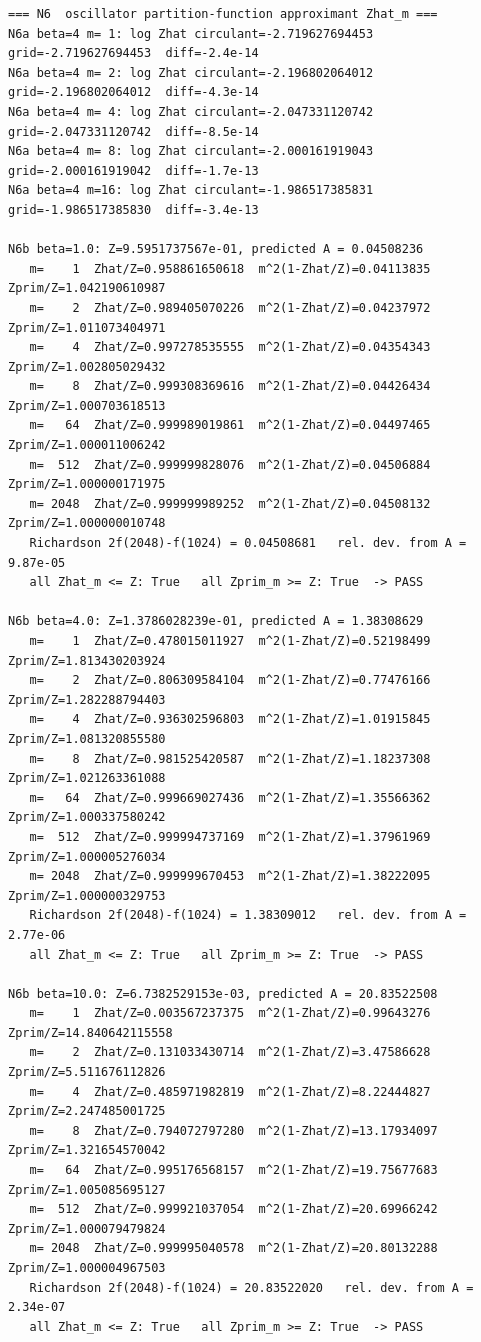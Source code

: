 \documentclass[11pt,a4paper]{article}
\begin{document}
\begin{lstlisting}
=== N6  oscillator partition-function approximant Zhat_m ===
N6a beta=4 m= 1: log Zhat circulant=-2.719627694453  grid=-2.719627694453  diff=-2.4e-14
N6a beta=4 m= 2: log Zhat circulant=-2.196802064012  grid=-2.196802064012  diff=-4.3e-14
N6a beta=4 m= 4: log Zhat circulant=-2.047331120742  grid=-2.047331120742  diff=-8.5e-14
N6a beta=4 m= 8: log Zhat circulant=-2.000161919043  grid=-2.000161919042  diff=-1.7e-13
N6a beta=4 m=16: log Zhat circulant=-1.986517385831  grid=-1.986517385830  diff=-3.4e-13

N6b beta=1.0: Z=9.5951737567e-01, predicted A = 0.04508236
   m=    1  Zhat/Z=0.958861650618  m^2(1-Zhat/Z)=0.04113835  Zprim/Z=1.042190610987
   m=    2  Zhat/Z=0.989405070226  m^2(1-Zhat/Z)=0.04237972  Zprim/Z=1.011073404971
   m=    4  Zhat/Z=0.997278535555  m^2(1-Zhat/Z)=0.04354343  Zprim/Z=1.002805029432
   m=    8  Zhat/Z=0.999308369616  m^2(1-Zhat/Z)=0.04426434  Zprim/Z=1.000703618513
   m=   64  Zhat/Z=0.999989019861  m^2(1-Zhat/Z)=0.04497465  Zprim/Z=1.000011006242
   m=  512  Zhat/Z=0.999999828076  m^2(1-Zhat/Z)=0.04506884  Zprim/Z=1.000000171975
   m= 2048  Zhat/Z=0.999999989252  m^2(1-Zhat/Z)=0.04508132  Zprim/Z=1.000000010748
   Richardson 2f(2048)-f(1024) = 0.04508681   rel. dev. from A = 9.87e-05
   all Zhat_m <= Z: True   all Zprim_m >= Z: True  -> PASS

N6b beta=4.0: Z=1.3786028239e-01, predicted A = 1.38308629
   m=    1  Zhat/Z=0.478015011927  m^2(1-Zhat/Z)=0.52198499  Zprim/Z=1.813430203924
   m=    2  Zhat/Z=0.806309584104  m^2(1-Zhat/Z)=0.77476166  Zprim/Z=1.282288794403
   m=    4  Zhat/Z=0.936302596803  m^2(1-Zhat/Z)=1.01915845  Zprim/Z=1.081320855580
   m=    8  Zhat/Z=0.981525420587  m^2(1-Zhat/Z)=1.18237308  Zprim/Z=1.021263361088
   m=   64  Zhat/Z=0.999669027436  m^2(1-Zhat/Z)=1.35566362  Zprim/Z=1.000337580242
   m=  512  Zhat/Z=0.999994737169  m^2(1-Zhat/Z)=1.37961969  Zprim/Z=1.000005276034
   m= 2048  Zhat/Z=0.999999670453  m^2(1-Zhat/Z)=1.38222095  Zprim/Z=1.000000329753
   Richardson 2f(2048)-f(1024) = 1.38309012   rel. dev. from A = 2.77e-06
   all Zhat_m <= Z: True   all Zprim_m >= Z: True  -> PASS

N6b beta=10.0: Z=6.7382529153e-03, predicted A = 20.83522508
   m=    1  Zhat/Z=0.003567237375  m^2(1-Zhat/Z)=0.99643276  Zprim/Z=14.840642115558
   m=    2  Zhat/Z=0.131033430714  m^2(1-Zhat/Z)=3.47586628  Zprim/Z=5.511676112826
   m=    4  Zhat/Z=0.485971982819  m^2(1-Zhat/Z)=8.22444827  Zprim/Z=2.247485001725
   m=    8  Zhat/Z=0.794072797280  m^2(1-Zhat/Z)=13.17934097  Zprim/Z=1.321654570042
   m=   64  Zhat/Z=0.995176568157  m^2(1-Zhat/Z)=19.75677683  Zprim/Z=1.005085695127
   m=  512  Zhat/Z=0.999921037054  m^2(1-Zhat/Z)=20.69966242  Zprim/Z=1.000079479824
   m= 2048  Zhat/Z=0.999995040578  m^2(1-Zhat/Z)=20.80132288  Zprim/Z=1.000004967503
   Richardson 2f(2048)-f(1024) = 20.83522020   rel. dev. from A = 2.34e-07
   all Zhat_m <= Z: True   all Zprim_m >= Z: True  -> PASS


\end{lstlisting}
\end{document}

